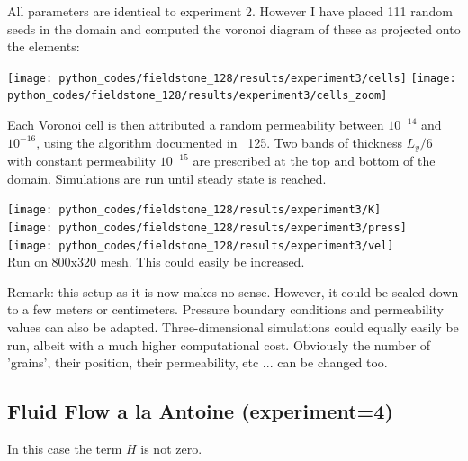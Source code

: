 All parameters are identical to experiment 2. However I have placed
111 random seeds in the domain and computed the voronoi diagram of these 
as projected onto the elements:

\begin{center}
\texttt{[image: python\_codes/fieldstone\_128/results/experiment3/cells]}
\texttt{[image: python\_codes/fieldstone\_128/results/experiment3/cells\_zoom]}
\end{center}

Each Voronoi cell is then 
attributed a random permeability between $10^{-14}$ and $10^{-16}$, 
using the algorithm documented in \stone~125.
Two bands of thickness $L_y/6$ with constant permeability $10^{-15}$ are 
prescribed at the top and bottom of the domain.
Simulations are run until steady state is reached. 

\begin{center}
\texttt{[image: python\_codes/fieldstone\_128/results/experiment3/K]}\\
\texttt{[image: python\_codes/fieldstone\_128/results/experiment3/press]}\\
\texttt{[image: python\_codes/fieldstone\_128/results/experiment3/vel]}\\
{\captionfont Run on 800x320 mesh. This could easily be increased.} 
\end{center}

Remark: this setup as it is now makes no sense. However, it could be scaled down to a few meters or
centimeters. Pressure boundary conditions and permeability values can also be adapted.
Three-dimensional simulations could equally easily be run, albeit with a much higher
computational cost. 
Obviously the number of 'grains', their position, their permeability, etc ... can be 
changed too.


\subsection*{Fluid Flow a la Antoine (experiment=4)}

In this case the term $H$ is not zero. 
